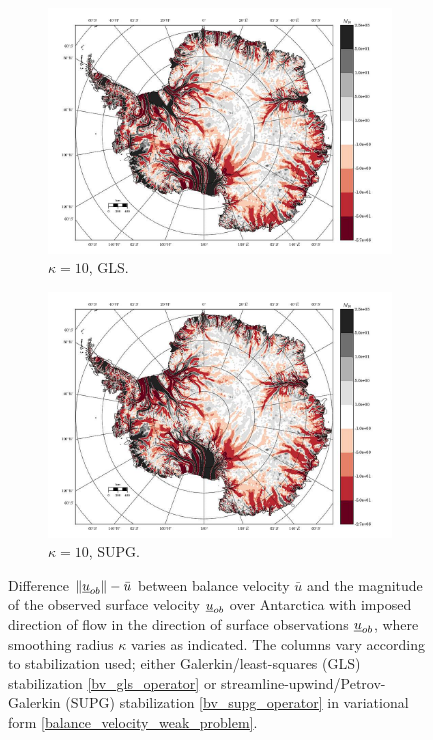 \begin{figure}
  \begin{subfigure}[b]{0.45\linewidth}
    \includegraphics[width=\linewidth]{images/balance_velocity/antarctica/d_U_ob/misfit_10H_kappa_10_GLS.jpg}
  \caption{$\kappa = 10$, GLS.}
  \label{antarctica_bv_image_kappa_5_GLS_U_ob_misfit}
  \end{subfigure}
  \begin{subfigure}[b]{0.45\linewidth}
    \includegraphics[width=\linewidth]{images/balance_velocity/antarctica/d_U_ob/misfit_10H_kappa_10_SUPG.jpg}
  \caption{$\kappa = 10$, SUPG.}
  \label{antarctica_bv_image_kappa_5_SUPG_U_ob_misfit}
  \end{subfigure}
  
  \caption[Antarctica balance-velocity misfit with $\mathbf{d}^{\text{data}} = \mathbf{u}_{ob}$.]{Difference $\Vert \underline{u}_{ob} \Vert - \bar{u}$ between balance velocity $\bar{u}$ and the magnitude of the observed surface velocity $\underline{u}_{ob}$ over Antarctica with imposed direction of flow in the direction of surface observations $\underline{u}_{ob}$, where smoothing radius $\kappa$ varies as indicated.  The columns vary according to  stabilization used; either Galerkin/least-squares (GLS) stabilization \cref{bv_gls_operator} or streamline-upwind/Petrov-Galerkin (SUPG) stabilization \cref{bv_supg_operator} in variational form \cref{balance_velocity_weak_problem}. \newline \newline}
  

\end{figure}
